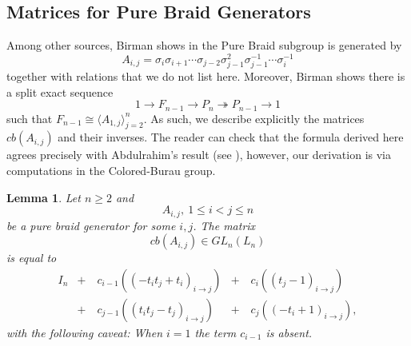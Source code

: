 \documentclass[11pt]{article}
\newtheorem{lemma}{Lemma}[section]
\begin{document}
\subsection{Matrices for Pure Braid Generators}\label{subsec:cb-xpl}
Among other sources, Birman shows in \cite{Birm} the Pure Braid subgroup is generated by
	$$A_{i,j}=\sigma_i\sigma_{i+1}\cdots \sigma_{j-2}\sigma_{j-1}^2\sigma_{j-1}^{-1}\cdots \sigma_i^{-1}$$
together with relations that we do not list here. Moreover, Birman shows there is a split exact 
sequence
	$$1\to F_{n-1}\to P_n\twoheadrightarrow P_{n-1}\to 1$$
such that $F_{n-1}\cong \langle A_{1,j}\rangle_{j=2}^n$. As such, we describe explicitly the matrices $cb(A_{i,j})$ and their inverses. The reader can check that the formula derived here agrees precisely with Abdulrahim's result (see \cite[Proposition 3.3.3]{phdthesis}), however, our derivation is via computations in the Colored-Burau group.

\begin{lemma}\label{lem:cb-xpl}
	Let $n\ge 2$ and
	\begin{equation*}
	A_{i,j},\ 1\le i<j\le n
	\end{equation*}
	be a pure braid generator for some $i,j$. The matrix
	\begin{equation*}
	cb(A_{i,j})\in GL_n(L_n)  
	\end{equation*}
	is equal to
	\begin{eqnarray*}
		I_n &+\quad c_{i-1}((-t_it_j+t_i)_{i\to j}) &+\quad c_i((t_j-1)_{i\to j})\\
		&+\quad c_{j-1}((t_it_j-t_j)_{i\to j}) &+\quad c_{j}((-t_i+1)_{i\to j}),
	\end{eqnarray*}
	with the following caveat: When $i=1$ the term $c_{i-1}$ is absent.
\end{lemma}
\end{document}
